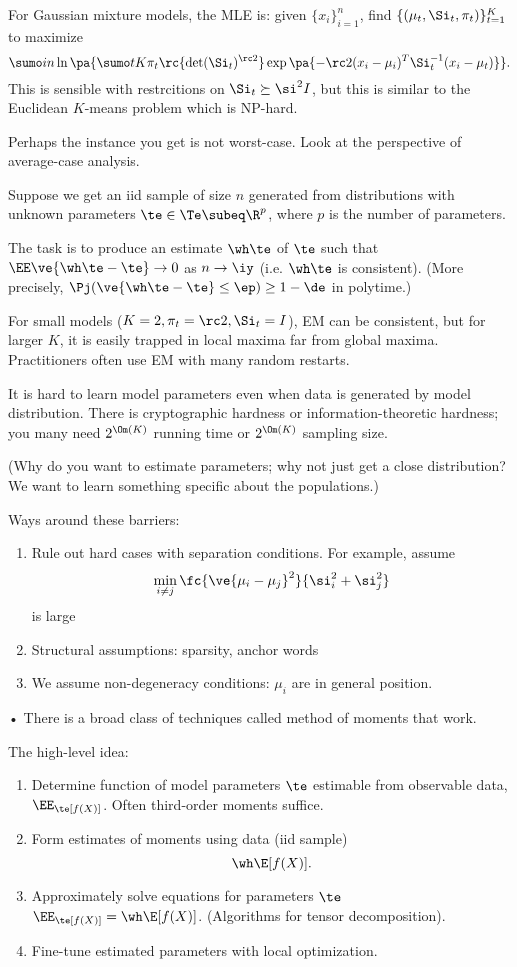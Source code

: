 For Gaussian mixture models, the MLE is: given $\{x_i\}_{i=1}^n$, find $\{(\mu_t,\Si_t,\pi_t)\}_{t=1}^K$ to maximize
$$
\sumo in \ln \pa{\sumo tK \pi_t \rc{\det(\Si_t)^{\rc 2}} \exp\pa{-\rc 2 (x_i-\mu_i)^T \Si_t^{-1} (x_i-\mu_t)}}.
$$
This is sensible with restrcitions on $\Si_t\succeq \si^2 I$, but 
this is similar to the Euclidean $K$-means problem which is NP-hard.

Perhaps the instance you get is not worst-case. Look at the perspective of average-case analysis.

Suppose we get an iid sample of size $n$ generated from distributions with unknown parameters $\te\in \Te\subeq \R^p$, where $p$ is the number of parameters.

The task is to produce an estimate $\wh \te$ of $\te$ such that $\EE\ve{\wh \te - \te}\to 0$ as $n\to \iy$ (i.e. $\wh \te$ is consistent). (More precisely, $\Pj(\ve{\wh \te  - \te}\le \ep)\ge 1-\de$ in polytime.)

For small models ($K=2, \pi_t=\rc2, \Si_t=I$), EM can be consistent, but for larger $K$, it is easily trapped in local maxima far from global maxima. Practitioners often use EM with many random restarts.

It is hard to learn model parameters even when data is generated by model distribution. There is cryptographic hardness or information-theoretic hardness; you many need $2^{\Om(K)}$ running time or $2^{\Om(K)}$ sampling size. 

(Why do you want to estimate parameters; why not just get a close distribution? We want to learn something specific about the populations.)

Ways around these barriers:
\begin{enumerate}
\item
Rule out hard cases with separation conditions. For example, assume
$$
\min_{i\ne j} \fc{\ve{\mu_i-\mu_j}^2}{\si_i^2+\si_j^2}
$$
is large
\item
Structural assumptions: sparsity, anchor words
\item
We assume non-degeneracy conditions: $\mu_i$ are in general position.
\end{enumerate}•
There is a broad class of techniques called method of moments that work.

The high-level idea:
\begin{enumerate}
\item
Determine function of model parameters $\te$ estimable from observable data, $\EE_\te [f(X)]$. Often third-order moments suffice.
\item
Form estimates of moments using data (iid sample)
$$
\wh \E[f(X)].
$$
\item
Approximately solve equations for parameters $\te$ $\EE_\te [f(X)] = \wh \E[f(X)]$. (Algorithms for tensor decomposition).
\item
Fine-tune estimated parameters with local optimization.
\end{enumerate}

